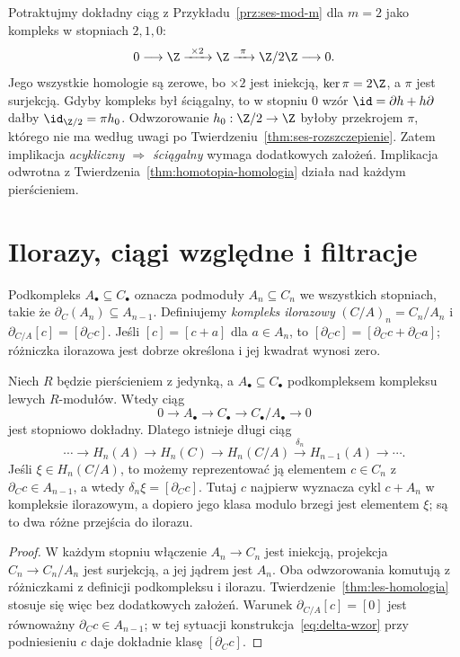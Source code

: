 \begin{przyklad}
\label{prz:acykliczny-niesciagalny}
Potraktujmy dokładny ciąg z
Przykładu~\ref{prz:ses-mod-m} dla $m=2$
jako kompleks w stopniach $2,1,0$:
\[
 0\longrightarrow\Z\xrightarrow{\ \times2\ }\Z
 \xrightarrow{\ \pi\ }\Z/2\Z\longrightarrow0.
\]
Jego wszystkie homologie są zerowe,
bo $\times2$ jest iniekcją,
$\ker\pi=2\Z$, a $\pi$ jest
surjekcją. Gdyby kompleks był
ściągalny, to w stopniu $0$
wzór $\id=\partial h+h\partial$ dałby
$\id_{\Z/2}=\pi h_0$.
Odwzorowanie $h_0:\Z/2\to\Z$ byłoby
przekrojem $\pi$, którego
nie ma według uwagi po
Twierdzeniu~\ref{thm:ses-rozszczepienie}.
Zatem implikacja \emph{acykliczny
$\Rightarrow$ ściągalny} wymaga
dodatkowych założeń. Implikacja
odwrotna z
Twierdzenia~\ref{thm:homotopia-homologia}
działa nad każdym pierścieniem.
\end{przyklad}

\section{Ilorazy, ciągi względne i filtracje}
\label{sec:iloraz-filtracja}

Podkompleks $A_\bullet\subseteq C_\bullet$
oznacza podmoduły $A_n\subseteq C_n$
we wszystkich stopniach, takie że
$\partial_C(A_n)\subseteq A_{n-1}$.
Definiujemy \emph{kompleks ilorazowy}
$(C/A)_n=C_n/A_n$ i
$\partial_{C/A}[c]=[\partial_Cc]$.
Jeśli $[c]=[c+a]$ dla $a\in A_n$,
to $[\partial_Cc]=[\partial_Cc+\partial_Ca]$;
różniczka ilorazowa jest dobrze
określona i jej kwadrat wynosi zero.

\begin{stwierdzenie}
\label{prop:ses-iloraz}
Niech $R$ będzie pierścieniem z jedynką,
a $A_\bullet\subseteq C_\bullet$ podkompleksem
kompleksu lewych $R$-modułów.
Wtedy ciąg
\[
 0\longrightarrow A_\bullet
 \longrightarrow C_\bullet
 \longrightarrow C_\bullet/A_\bullet
 \longrightarrow0
\]
jest stopniowo dokładny. Dlatego istnieje
długi ciąg
\begin{equation}\label{eq:les-iloraz}
 \cdots\to H_n(A)\to H_n(C)\to H_n(C/A)
 \xrightarrow{\delta_n}H_{n-1}(A)\to\cdots.
\end{equation}
Jeśli $\xi\in H_n(C/A)$, to możemy
reprezentować ją elementem $c\in C_n$
z $\partial_Cc\in A_{n-1}$, a wtedy
$\delta_n\xi=[\partial_Cc]$. Tutaj $c$ najpierw wyznacza cykl
$c+A_n$ w kompleksie ilorazowym, a dopiero jego klasa modulo
brzegi jest elementem $\xi$; są to dwa różne przejścia do ilorazu.
\end{stwierdzenie}
\begin{proof}
W każdym stopniu włączenie $A_n\to C_n$
jest iniekcją, projekcja $C_n\to C_n/A_n$
jest surjekcją, a jej jądrem jest $A_n$.
Oba odwzorowania komutują z różniczkami
z definicji podkompleksu i ilorazu.
Twierdzenie~\ref{thm:les-homologia}
stosuje się więc bez dodatkowych
założeń. Warunek
$\partial_{C/A}[c]=[0]$ jest równoważny
$\partial_Cc\in A_{n-1}$; w tej sytuacji
konstrukcja~\eqref{eq:delta-wzor}
przy podniesieniu $c$ daje dokładnie
klasę $[\partial_Cc]$.
\end{proof}

